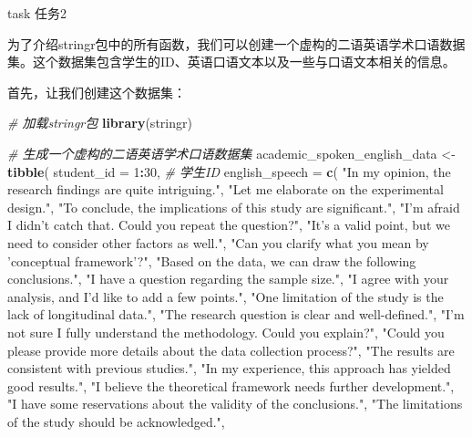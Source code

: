 \documentclass[]{book}
\newenvironment{Shaded}{\begin{snugshade}}{\end{snugshade}}
\newcommand{\CommentTok}[1]{\textcolor[rgb]{0.56,0.35,0.01}{\textit{#1}}}
\newcommand{\DataTypeTok}[1]{\textcolor[rgb]{0.13,0.29,0.53}{#1}}
\newcommand{\DecValTok}[1]{\textcolor[rgb]{0.00,0.00,0.81}{#1}}
\newcommand{\KeywordTok}[1]{\textcolor[rgb]{0.13,0.29,0.53}{\textbf{#1}}}
\newcommand{\NormalTok}[1]{#1}
\newcommand{\OperatorTok}[1]{\textcolor[rgb]{0.81,0.36,0.00}{\textbf{#1}}}
\newcommand{\StringTok}[1]{\textcolor[rgb]{0.31,0.60,0.02}{#1}}
\begin{document}
\begin{infobox}task
任务2

\end{infobox}

为了介绍stringr包中的所有函数，我们可以创建一个虚构的二语英语学术口语数据集。这个数据集包含学生的ID、英语口语文本以及一些与口语文本相关的信息。

首先，让我们创建这个数据集：

\begin{Shaded}
\begin{Highlighting}[]
\CommentTok{# 加载stringr包}
\KeywordTok{library}\NormalTok{(stringr)}

\CommentTok{# 生成一个虚构的二语英语学术口语数据集}
\NormalTok{academic_spoken_english_data <-}\StringTok{ }\KeywordTok{tibble}\NormalTok{(}
  \DataTypeTok{student_id =} \DecValTok{1}\OperatorTok{:}\DecValTok{30}\NormalTok{,  }\CommentTok{# 学生ID}
  \DataTypeTok{english_speech =} \KeywordTok{c}\NormalTok{(}
    \StringTok{"In my opinion, the research findings are quite intriguing."}\NormalTok{,}
    \StringTok{"Let me elaborate on the experimental design."}\NormalTok{,}
    \StringTok{"To conclude, the implications of this study are significant."}\NormalTok{,}
    \StringTok{"I'm afraid I didn't catch that. Could you repeat the question?"}\NormalTok{,}
    \StringTok{"It's a valid point, but we need to consider other factors as well."}\NormalTok{,}
    \StringTok{"Can you clarify what you mean by 'conceptual framework'?"}\NormalTok{,}
    \StringTok{"Based on the data, we can draw the following conclusions."}\NormalTok{,}
    \StringTok{"I have a question regarding the sample size."}\NormalTok{,}
    \StringTok{"I agree with your analysis, and I'd like to add a few points."}\NormalTok{,}
    \StringTok{"One limitation of the study is the lack of longitudinal data."}\NormalTok{,}
    \StringTok{"The research question is clear and well-defined."}\NormalTok{,}
    \StringTok{"I'm not sure I fully understand the methodology. Could you explain?"}\NormalTok{,}
    \StringTok{"Could you please provide more details about the data collection process?"}\NormalTok{,}
    \StringTok{"The results are consistent with previous studies."}\NormalTok{,}
    \StringTok{"In my experience, this approach has yielded good results."}\NormalTok{,}
    \StringTok{"I believe the theoretical framework needs further development."}\NormalTok{,}
    \StringTok{"I have some reservations about the validity of the conclusions."}\NormalTok{,}
    \StringTok{"The limitations of the study should be acknowledged."}\NormalTok{,}

\end{Highlighting}
\end{Shaded}
\end{document}
